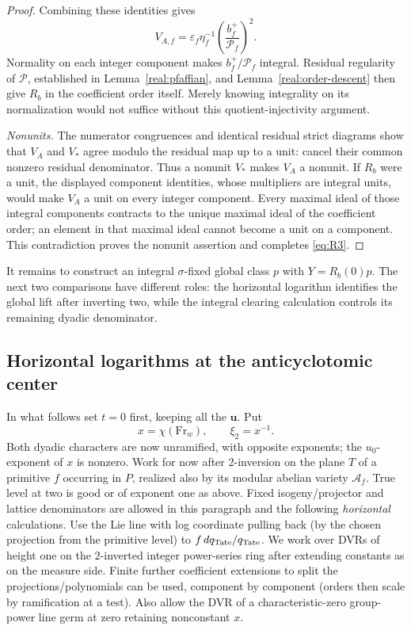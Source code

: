 \begin{proof}
Combining these identities gives
\[
 V_{A,f}=\varepsilon_f\eta_f^{-1}
       \left(\frac{b_f^+}{\mathcal P_f}\right)^2.
\]
Normality on each integer component makes \(b_f^+/\mathcal P_f\)
integral. Residual regularity of \(\mathcal P\), established in
Lemma~\ref{real:pfaffian}, and Lemma~\ref{real:order-descent} then
give \(R_b\) in the coefficient order itself. Merely knowing
integrality on its normalization would not suffice without this
quotient-injectivity argument.

\emph{Nonunits.}
The numerator congruences and identical residual strict diagrams
show that \(V_A\) and \(V_*\) agree modulo the residual map up to a
unit: cancel their common nonzero residual denominator. Thus a
nonunit \(V_*\) makes \(V_A\) a nonunit. If \(R_b\) were a unit,
the displayed component identities, whose multipliers are integral
units, would make \(V_A\) a unit on every integer component. Every
maximal ideal of those integral components contracts to the unique
maximal ideal of the coefficient order; an element in that maximal
ideal cannot become a unit on a component. This contradiction proves
the nonunit assertion and completes \eqref{eq:R3}.
\end{proof}



It remains to construct an integral \(\sigma\)-fixed global class
\(p\) with \(Y=R_b(0)p\). The next two comparisons have different
roles: the horizontal logarithm identifies the global lift after
inverting two, while the integral clearing calculation controls its
remaining dyadic denominator.

\subsection{Horizontal logarithms at the anticyclotomic center}

In what follows set \(t=0\) first, keeping all the \(\mathbf u\). Put
\[
                   x=\chi(\mathrm{Fr}_w),\qquad \xi_2=x^{-1}.
\]
Both dyadic characters are now unramified, with opposite exponents; the \(u_0\)-exponent of \(x\) is nonzero. Work for now after 2-inversion on the plane \(T\) of a primitive \(f\) occurring in \(P\), realized also by its modular abelian variety \(\mathcal A_f\). True level at two is good or of exponent one as above. Fixed isogeny/projector and lattice denominators are allowed in this paragraph and the following \emph{horizontal} calculations. Use the Lie line with log coordinate pulling back (by the chosen projection from the primitive level) to \(f\,dq_{\rm Tate}/q_{\rm Tate}\). We work over DVRs of height one on the 2-inverted integer power-series ring after extending constants as on the measure side. Finite further coefficient extensions to split the projections/polynomials can be used, component by component (orders then scale by ramification at a test). Also allow the DVR of a characteristic-zero group-power line germ at zero retaining nonconstant \(x\).

